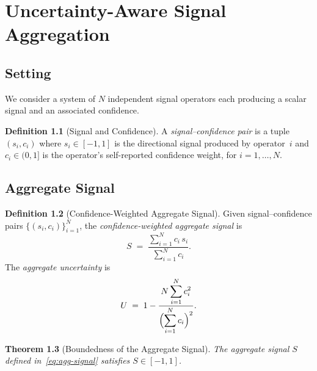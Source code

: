 \documentclass[12pt,openany]{book}
\numberwithin{equation}{chapter}
\theoremstyle{plain}
\newtheorem{theorem}{Theorem}[chapter]
\theoremstyle{definition}
\newtheorem{definition}[theorem]{Definition}
\theoremstyle{remark}
\numberwithin{equation}{chapter}
\theoremstyle{plain}
\begin{document}
\chapter{Uncertainty-Aware Signal Aggregation}
\label{ch:signal-agg}

\section{Setting}

We consider a system of $N$ independent signal operators each producing a
scalar signal and an associated confidence.

\begin{definition}[Signal and Confidence]
\label{def:signal-confidence}
A \emph{signal--confidence pair} is a tuple $(s_i, c_i)$ where
$s_i \in [-1, 1]$ is the directional signal produced by operator~$i$ and
$c_i \in (0, 1]$ is the operator's self-reported confidence weight,
for $i = 1, \ldots, N$.
\end{definition}

\section{Aggregate Signal}

\begin{definition}[Confidence-Weighted Aggregate Signal]
\label{def:agg-signal}
Given signal--confidence pairs $\{(s_i, c_i)\}_{i=1}^{N}$, the
\emph{confidence-weighted aggregate signal} is
\begin{equation}
  S \;=\; \frac{\displaystyle\sum_{i=1}^{N} c_i\,s_i}
               {\displaystyle\sum_{i=1}^{N} c_i}.
  \label{eq:agg-signal}
\end{equation}
The \emph{aggregate uncertainty} is
\begin{equation}
  U \;=\; 1 - \frac{\displaystyle N\sum_{i=1}^{N} c_i^{2}}
                   {\Bigl(\displaystyle\sum_{i=1}^{N} c_i\Bigr)^{2}}.
  \label{eq:agg-uncertainty}
\end{equation}
\end{definition}

\begin{theorem}[Boundedness of the Aggregate Signal]
\label{thm:signal-bounded}
The aggregate signal $S$ defined in~\eqref{eq:agg-signal} satisfies
$S \in [-1, 1]$.
\end{theorem}
\end{document}
